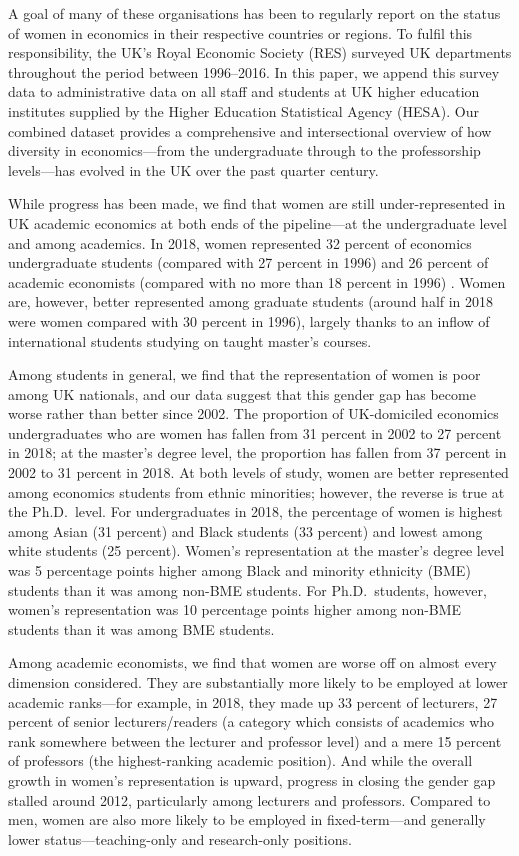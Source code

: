 \documentclass[a4paper, 1]{article}
\begin{document}
A goal of many of these organisations has been to regularly report on the status of women in economics in their respective countries or regions. To fulfil this responsibility, the UK's Royal Economic Society (RES) surveyed UK departments throughout the period between 1996--2016. In this paper, we append this survey data to administrative data on all staff and students at UK higher education institutes supplied by the Higher Education Statistical Agency (HESA). Our combined dataset provides a comprehensive and intersectional overview of how diversity in economics---from the undergraduate through to the professorship levels---has evolved in the UK over the past quarter century.

While progress has been made, we find that women are still under-represented in UK academic economics at both ends of the pipeline---at the undergraduate level and among academics. In 2018, women represented 32 percent of economics undergraduate students (compared with 27 percent in 1996) and 26 percent of academic economists (compared with no more than 18 percent in 1996) \citep{Mumford1997, Tenreyro2017}. Women are, however, better represented among graduate students (around half in 2018 were women compared with 30 percent in 1996), largely thanks to an inflow of international students studying on taught master's courses.

Among students in general, we find that the representation of women is poor among UK nationals, and our data suggest that this gender gap has become worse rather than better since 2002. The proportion of UK-domiciled economics undergraduates who are women has fallen from 31 percent in 2002 to 27 percent in 2018; at the master's degree level, the proportion has fallen from 37 percent in 2002 to 31 percent in 2018. At both levels of study, women are better represented among economics students from ethnic minorities; however, the reverse is true at the Ph.D.~level. For undergraduates in 2018, the percentage of women is highest among Asian (31 percent) and Black students (33 percent) and lowest among white students (25 percent). Women's representation at the master's degree level was 5 percentage points higher among Black and minority ethnicity (BME) students than it was among non-BME students. For Ph.D.~students, however, women's representation was 10 percentage points higher among non-BME students than it was among BME students.

Among academic economists, we find that women are worse off on almost every dimension considered. They are substantially more likely to be employed at lower academic ranks---for example, in 2018, they made up 33 percent of lecturers, 27 percent of senior lecturers/readers (a category which consists of academics who rank somewhere between the lecturer and professor level) and a mere 15 percent of professors (the highest-ranking academic position). And while the overall growth in women's representation is upward, progress in closing the gender gap stalled around 2012, particularly among lecturers and professors. Compared to men, women are also more likely to be employed in fixed-term---and generally lower status---teaching-only and research-only positions.
\end{document}

